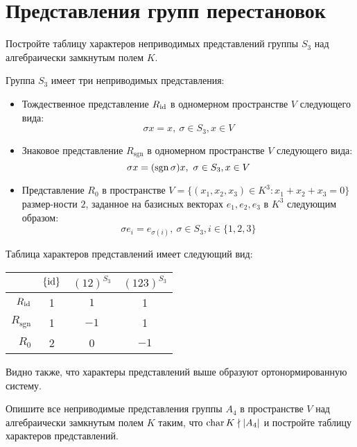 \section{Представления групп перестановок}

\begin{problem}
	Постройте таблицу характеров неприводимых представлений группы $S_3$ над алгебраически замкнутым полем $K$.
\end{problem}

\begin{solution}
	Группа $S_3$ имеет три неприводимых представления:
	\begin{itemize}
		\item Тождественное представление $R_{\mathrm{id}}$ в одномерном пространстве $V$ следующего вида:
		\[\sigma x = x,~\sigma \in S_3, x \in V\]
		
		\item Знаковое представление $R_{\mathrm{sgn}}$ в одномерном пространстве $V$ следующего вида:
		\[\sigma x = (\operatorname{sgn}\sigma)x,~\sigma \in S_3, x \in V\]
		
		\item Представление $R_0$ в пространстве $V = \{(x_1, x_2, x_3) \in K^3 : x_1 + x_2 + x_3 = 0\}$ размер-ности $2$, заданное на базисных векторах $e_1, e_2, e_3$ в $K^3$ следующим образом:
		\[\sigma e_i = e_{\sigma(i)},~\sigma \in S_3, i \in \{1, 2, 3\}\]
	\end{itemize}
	
	Таблица характеров представлений имеет следующий вид:
	\begin{center}
		\begin{tabular}{r|c|c|c}
			& $\{\mathrm{id}\}$ & $(12)^{S_3}$ & $(123)^{S_3}$ \\ \hline
			$R_{\mathrm{id}}$ &     1     &     $1$      &       1       \\
			$R_{\mathrm{sgn}}$ &     1     &     $-1$     &       1       \\ 
			$R_0$ &     2     &      0       &     $-1$
		\end{tabular}
	\end{center}
	
	Видно также, что характеры представлений выше образуют ортонормированную систему.
\end{solution}

\begin{problem}
	Опишите все неприводимые представления группы $A_4$ в пространстве $V$ над алгебраически замкнутым полем $K$ таким, что $\operatorname{char}{K} \nmid |A_4|$ и постройте таблицу характеров представлений.
\end{problem}


